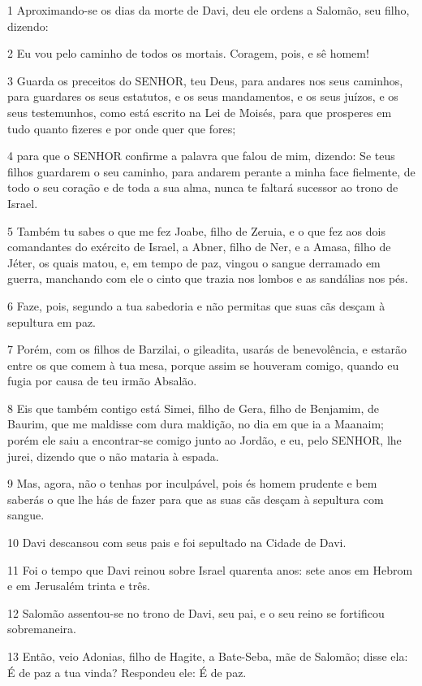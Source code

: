 \par 1 Aproximando-se os dias da morte de Davi, deu ele ordens a Salomão, seu filho, dizendo:
\par 2 Eu vou pelo caminho de todos os mortais. Coragem, pois, e sê homem!
\par 3 Guarda os preceitos do SENHOR, teu Deus, para andares nos seus caminhos, para guardares os seus estatutos, e os seus mandamentos, e os seus juízos, e os seus testemunhos, como está escrito na Lei de Moisés, para que prosperes em tudo quanto fizeres e por onde quer que fores;
\par 4 para que o SENHOR confirme a palavra que falou de mim, dizendo: Se teus filhos guardarem o seu caminho, para andarem perante a minha face fielmente, de todo o seu coração e de toda a sua alma, nunca te faltará sucessor ao trono de Israel.
\par 5 Também tu sabes o que me fez Joabe, filho de Zeruia, e o que fez aos dois comandantes do exército de Israel, a Abner, filho de Ner, e a Amasa, filho de Jéter, os quais matou, e, em tempo de paz, vingou o sangue derramado em guerra, manchando com ele o cinto que trazia nos lombos e as sandálias nos pés.
\par 6 Faze, pois, segundo a tua sabedoria e não permitas que suas cãs desçam à sepultura em paz.
\par 7 Porém, com os filhos de Barzilai, o gileadita, usarás de benevolência, e estarão entre os que comem à tua mesa, porque assim se houveram comigo, quando eu fugia por causa de teu irmão Absalão.
\par 8 Eis que também contigo está Simei, filho de Gera, filho de Benjamim, de Baurim, que me maldisse com dura maldição, no dia em que ia a Maanaim; porém ele saiu a encontrar-se comigo junto ao Jordão, e eu, pelo SENHOR, lhe jurei, dizendo que o não mataria à espada.
\par 9 Mas, agora, não o tenhas por inculpável, pois és homem prudente e bem saberás o que lhe hás de fazer para que as suas cãs desçam à sepultura com sangue.
\par 10 Davi descansou com seus pais e foi sepultado na Cidade de Davi.
\par 11 Foi o tempo que Davi reinou sobre Israel quarenta anos: sete anos em Hebrom e em Jerusalém trinta e três.
\par 12 Salomão assentou-se no trono de Davi, seu pai, e o seu reino se fortificou sobremaneira.
\par 13 Então, veio Adonias, filho de Hagite, a Bate-Seba, mãe de Salomão; disse ela: É de paz a tua vinda? Respondeu ele: É de paz.
